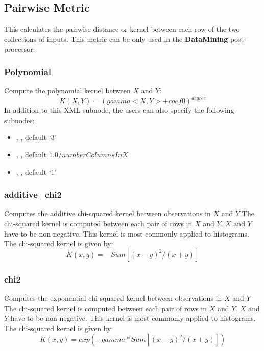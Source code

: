 \subsection{Pairwise Metric}
\label{subsection:pairwiseMetric}
This calculates the pairwise distance or kernel between each row of the two collections of inputs. This
metric can be only used in the \textbf{DataMining} post-processor.

\subsubsection{Polynomial}
Compute the polynomial kernel between $X$ and $Y$:
\begin{equation}
  K(X, Y) = (gamma <X, Y> + coef0)^{degree}
\end{equation}
In addition to this XML subnode, the users can also specify the following subnodes:
\begin{itemize}
  \item {}, , default `3'
  \item {}, , default $1.0/numberColumnsInX$
  \item {}, , default `1'
\end{itemize}

\subsubsection{additive\_chi2}
Computes the additive chi-squared kernel between observations in $X$ and $Y$
The chi-squared kernel is computed between each pair of rows in $X$ and $Y$. $X$ and $Y$ have to be non-negative.
This kernel is most commonly applied to histograms.
The chi-squared kernel is given by:
\begin{equation}
  K(x, y) = - Sum [(x - y)^2 / (x + y)]
\end{equation}


\subsubsection{chi2}
Computes the exponential chi-squared kernel between observations in $X$ and $Y$
The chi-squared kernel is computed between each pair of rows in $X$ and $Y$. $X$ and $Y$ have to be non-negative.
This kernel is most commonly applied to histograms.
The chi-squared kernel is given by:
\begin{equation}
  K(x, y) = exp(- gamma * Sum [(x - y)^2 / (x + y)])
\end{equation}

